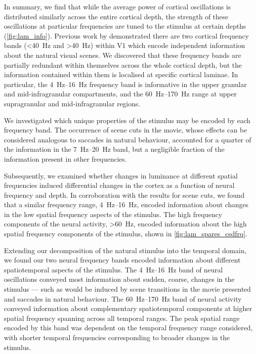 In summary, we find that while the average power of cortical oscillations is distributed similarly across the entire cortical depth, the strength of these oscillations at particular frequencies are tuned to the stimulus at certain depths (\autoref{fig:lam_info}).
Previous work by \citet{Belitski2008} demonstrated there are two cortical frequency bands (\SI{<40}{Hz} and \SI{>40}{Hz}) within \ac{V1} which encode independent information about the natural visual scenes.
We discovered that these frequency bands are partially redundant within themselves across the whole cortical depth, but the information contained within them is localised at specific cortical laminae.
In particular, the \SIrange{4}{16}{Hz} frequency band is informative in the upper granular and mid-infragranular compartments, and the \SIrange{60}{170}{Hz} range at upper supragranular and mid-infragranular regions.

We investigated which unique properties of the stimulus may be encoded by each frequency band.
The occurrence of scene cuts in the movie, whose effects can be considered analogous to saccades in natural behaviour, accounted for a quarter of the information in the \SIrange{7}{20}{Hz} band, but a negligible fraction of the information present in other frequencies.

Subsequently, we examined whether changes in luminance at different spatial frequencies induced differential changes in the cortex as a function of neural frequency and depth.
In corroboration with the results for scene cuts, we found that a similar frequency range, \SIrange{4}{16}{Hz}, encoded information about changes in the low spatial frequency aspects of the stimulus.
The high frequency components of the neural activity, \SI{>60}{Hz}, encoded information about the high spatial frequency components of the stimulus, shown in \autoref{fig:lam_spares_csdfrq}.

Extending our decomposition of the natural stimulus into the temporal domain, we found our two neural frequency bands encoded information about different spatiotemporal aspects of the stimulus.
The \SIrange{4}{16}{Hz} band of neural oscillations conveyed most information about sudden, coarse, changes in the stimulus --- such as would be induced by scene transitions in the movie presented and saccades in natural behaviour.
The \SIrange{60}{170}{Hz} band of neural activity conveyed information about complementary spatiotemporal components at higher spatial frequency spanning across all temporal ranges.
The peak spatial range encoded by this band was dependent on the temporal frequency range considered, with shorter temporal frequencies corresponding to broader changes in the stimulus.

